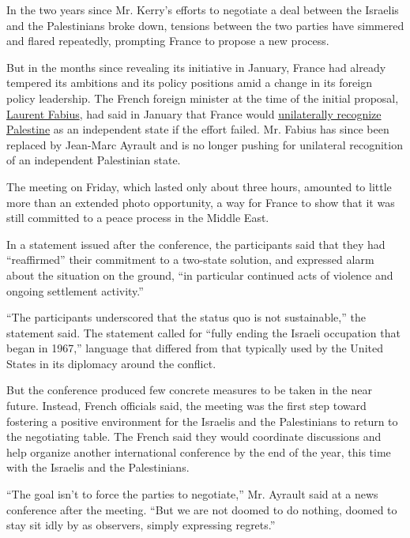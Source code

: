 In the two years since Mr. Kerry's efforts to negotiate a deal between
the Israelis and the Palestinians broke down, tensions between the two
parties have simmered and flared repeatedly, prompting France to propose
a new process.

But in the months since revealing its initiative in January, France had
already tempered its ambitions and its policy positions amid a change in
its foreign policy leadership. The French foreign minister at the time
of the initial proposal,
\href{http://www.nytimes.com/2016/02/11/world/europe/laurent-fabius-france-resignation.html}{Laurent
Fabius}, had said in January that France would
\href{http://www.nytimes.com/2016/01/30/world/middleeast/france-plans-mideast-peace-effort-and-recognition-of-palestine-if-it-fails.html}{unilaterally
recognize Palestine} as an independent state if the effort failed. Mr.
Fabius has since been replaced by Jean-Marc Ayrault and is no longer
pushing for unilateral recognition of an independent Palestinian state.

The meeting on Friday, which lasted only about three hours, amounted to
little more than an extended photo opportunity, a way for France to show
that it was still committed to a peace process in the Middle East.

In a statement issued after the conference, the participants said that
they had ``reaffirmed'' their commitment to a two-state solution, and
expressed alarm about the situation on the ground, ``in particular
continued acts of violence and ongoing settlement activity.''

``The participants underscored that the status quo is not sustainable,''
the statement said. The statement called for ``fully ending the Israeli
occupation that began in 1967,'' language that differed from that
typically used by the United States in its diplomacy around the
conflict.

But the conference produced few concrete measures to be taken in the
near future. Instead, French officials said, the meeting was the first
step toward fostering a positive environment for the Israelis and the
Palestinians to return to the negotiating table. The French said they
would coordinate discussions and help organize another international
conference by the end of the year, this time with the Israelis and the
Palestinians.

``The goal isn't to force the parties to negotiate,'' Mr. Ayrault said
at a news conference after the meeting. ``But we are not doomed to do
nothing, doomed to stay sit idly by as observers, simply expressing
regrets.''

